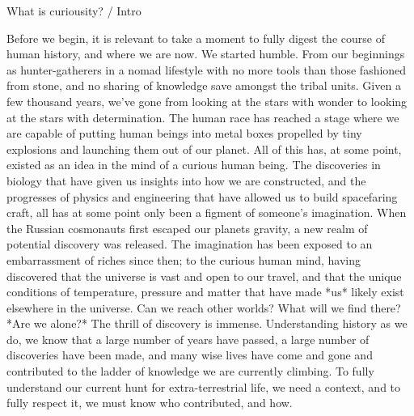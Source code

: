 What is curiousity? / Intro

Before we begin, it is relevant to take a moment to fully digest the course of human history, and where we are now. We started humble. From our beginnings as hunter-gatherers in a nomad lifestyle with no more tools than those fashioned from stone, and no sharing of knowledge save amongst the tribal units. Given a few thousand years, we've gone from looking at the stars with wonder to looking at the stars with determination. The human race has reached a stage where we are capable of putting human beings into metal boxes propelled by tiny explosions and launching them out of our planet. All of this has, at some point, existed as an idea in the mind of a curious human being. The discoveries in biology that have given us insights into how we are constructed, and the progresses of physics and engineering that have allowed us to build spacefaring craft, all has at some point only been a figment of someone's imagination. 
When the Russian cosmonauts first escaped our planets gravity, a new realm of potential discovery was released. The imagination has been exposed to an embarrassment of riches since then; to the curious human mind, having discovered that the universe is vast and open to our travel, and that the unique conditions of temperature, pressure and matter that have made *us* likely exist elsewhere in the universe.  
Can we reach other worlds? What will we find there? *Are we alone?* The thrill of discovery is immense. Understanding history as we do, we know that a large number of years have passed, a large number of discoveries have been made, and many wise lives have come and gone and contributed to the ladder of knowledge we are currently climbing. To fully understand our current hunt for extra-terrestrial life, we need a context, and to fully respect it, we must know who contributed, and how.

